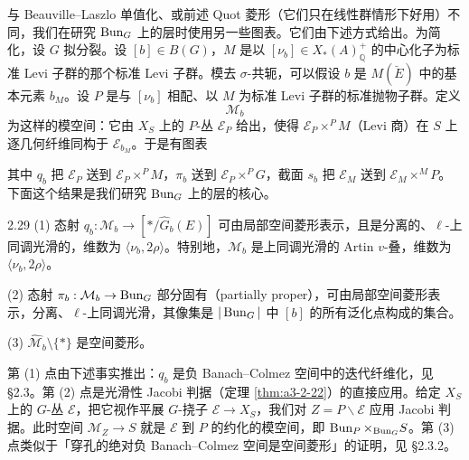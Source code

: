 与 Beauville--Laszlo 单值化、或前述 Quot 菱形（它们只在线性群情形下好用）不同，我们在研究 $\operatorname{Bun}_G$ 上的层时使用另一些图表。它们由下述方式给出。为简化，设 $G$ 拟分裂。设 $[b]\in B(G)$，$M$ 是以 $[\nu_b]\in X_*(A)^+_{\mathbb Q}$ 的中心化子为标准 Levi 子群的那个标准 Levi 子群。模去 $\sigma$-共轭，可以假设 $b$ 是 $M(\breve E)$ 中的基本元素 $b_M$。设 $P$ 是与 $[\nu_b]$ 相配、以 $M$ 为标准 Levi 子群的标准抛物子群。定义
\[
\mathcal M_b
\]
为这样的模空间：它由 $X_S$ 上的 $P$-丛 $\mathcal E_P$ 给出，使得 $\mathcal E_P\times^P M$（Levi 商）在 $S$ 上逐几何纤维同构于 $\mathcal E_{b_M}$。于是有图表
\begin{center}
\end{center}
其中 $q_b$ 把 $\mathcal E_P$ 送到 $\mathcal E_P\times^P M$，$\pi_b$ 送到 $\mathcal E_P\times^P G$，截面 $s_b$ 把 $\mathcal E_M$ 送到 $\mathcal E_M\times^M P$。下面这个结果是我们研究 $\operatorname{Bun}_G$ 上的层的核心。
\begin{thm}{2.29}
(1) 态射 $q_b:\mathcal M_b\to[*/\widehat G_b(E)]$ 可由局部空间菱形表示，且是分离的、$\ell$-上同调光滑的，维数为 $\langle\nu_b,2\rho\rangle$。特别地，$\mathcal M_b$ 是上同调光滑的 Artin $v$-叠，维数为 $\langle\nu_b,2\rho\rangle$。

(2) 态射 $\pi_b:\mathcal M_b\to\operatorname{Bun}_G$ 部分固有（partially proper），可由局部空间菱形表示，分离、$\ell$-上同调光滑，其像集是 $|\operatorname{Bun}_G|$ 中 $[b]$ 的所有泛化点构成的集合。

(3) $\widehat{\mathcal M}_b\setminus\{*\}$ 是空间菱形。\label{thm:a3-2-29}
\end{thm}
第 (1) 点由下述事实推出：$q_b$ 是负 Banach--Colmez 空间中的迭代纤维化，见 §2.3。第 (2) 点是光滑性 Jacobi 判据（定理 \ref{thm:a3-2-22}）的直接应用。给定 $X_S$ 上的 $G$-丛 $\mathcal E$，把它视作平展 $G$-挠子 $\mathcal E\to X_S$，我们对 $Z=P\backslash\mathcal E$ 应用 Jacobi 判据。此时空间 $\mathcal M_Z\to S$ 就是 $\mathcal E$ 到 $P$ 的约化的模空间，即 $\operatorname{Bun}_P\times_{\operatorname{Bun}_G}S$。第 (3) 点类似于「穿孔的绝对负 Banach--Colmez 空间是空间菱形」的证明，见 §2.3.2。
